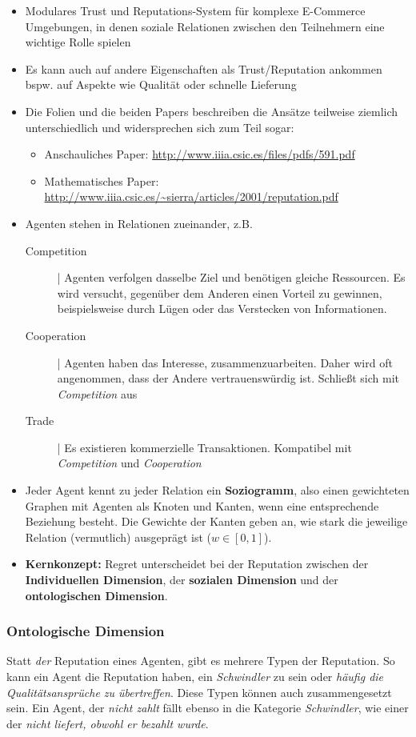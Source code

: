 \documentclass{article} %
\begin{document}
	\begin{itemize}
		\item Modulares Trust und Reputations-System für komplexe E-Commerce Umgebungen, in denen soziale Relationen zwischen den Teilnehmern eine wichtige Rolle spielen
		\item Es kann auch auf andere Eigenschaften als Trust/Reputation ankommen bspw. auf Aspekte wie Qualität oder schnelle Lieferung
		\item Die Folien und die beiden Papers beschreiben die Ansätze teilweise ziemlich unterschiedlich und widersprechen sich zum Teil sogar:
		\begin{itemize}
				\item Anschauliches Paper: \url{http://www.iiia.csic.es/files/pdfs/591.pdf}
				\item Mathematisches Paper:  \url{http://www.iiia.csic.es/~sierra/articles/2001/reputation.pdf}
		\end{itemize}
	
		\item Agenten stehen in Relationen zueinander, z.B.
		\begin{description}
			\item[Competition]| Agenten verfolgen dasselbe Ziel und benötigen gleiche Ressourcen.
			Es wird versucht, gegenüber dem Anderen einen Vorteil zu gewinnen, beispielsweise durch Lügen oder das Verstecken von Informationen.
			\item[Cooperation]| Agenten haben das Interesse, zusammenzuarbeiten.
			Daher wird oft angenommen, dass der Andere vertrauenswürdig ist.
			Schließt sich mit \emph{Competition} aus
			\item[Trade]| Es existieren kommerzielle Transaktionen.
			Kompatibel mit \emph{Competition} und \emph{Cooperation}
		\end{description}
		\item Jeder Agent kennt zu jeder Relation ein \textbf{Soziogramm}, also einen gewichteten Graphen mit Agenten als Knoten und Kanten, wenn eine entsprechende Beziehung besteht.
		Die Gewichte der Kanten geben an, wie stark die jeweilige Relation (vermutlich) ausgeprägt ist ($w\in [0,1]$).
		\item \textbf{Kernkonzept:} Regret unterscheidet bei der Reputation zwischen der \textbf{Individuellen Dimension}, der \textbf{sozialen Dimension} und der \textbf{ontologischen Dimension}.
	\end{itemize}
	\subsubsection{Ontologische Dimension}
	Statt \emph{der} Reputation eines Agenten, gibt es mehrere Typen der Reputation.
	So kann ein Agent die Reputation haben, ein \emph{Schwindler} zu sein oder \emph{häufig die Qualitätsansprüche zu übertreffen}. 
	Diese Typen können auch zusammengesetzt sein.
	Ein Agent, der \emph{nicht zahlt} fällt ebenso in die Kategorie \emph{Schwindler}, wie einer der \emph{nicht liefert, obwohl er bezahlt wurde}.
\end{document}
